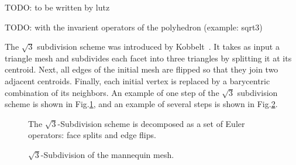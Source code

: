 TODO: to be written by lutz

TODO: with the invarient operators of the polyhedron (example: sqrt3)

The $\sqrt{3}$ subdivision scheme was introduced by
Kobbelt~\cite{sqrt3}. It takes as input a triangle mesh and subdivides
each facet into three triangles by splitting it at its centroid. Next,
all edges of the initial mesh are flipped so that they join two
adjacent centroids. Finally, each initial vertex is replaced by a
barycentric combination of its neighbors. An example of one step of
the $\sqrt{3}$ subdivision scheme is shown in
Fig.\ref{fig:sqrt3_basic}, and an example of several steps is shown in
Fig.\ref{fig:sqrt3}.

\begin{figure}[htb]
    \caption{The $\sqrt{3}$-Subdivision scheme is decomposed as
             a set of Euler operators: face splits and edge flips.}
    \label{fig:sqrt3_basic}
\end{figure}

\begin{figure}[htb]
    \caption{$\sqrt{3}$-Subdivision of the mannequin mesh.}
    \label{fig:sqrt3}
\end{figure}
